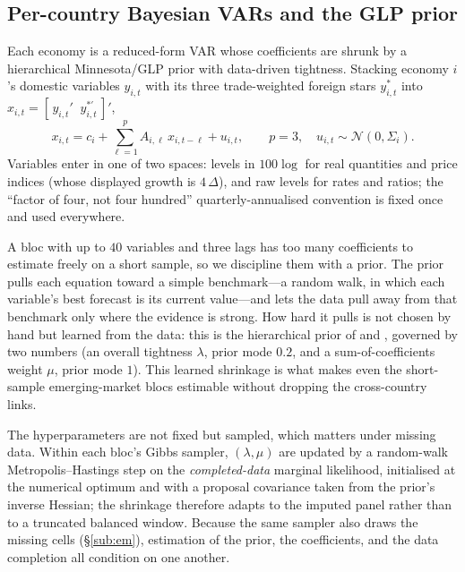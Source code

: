 \documentclass[11pt]{article}
\begin{document}
\subsection{Per-country Bayesian VARs and the GLP prior}
\label{sub:blocs}

Each economy is a reduced-form VAR whose coefficients are shrunk by a hierarchical Minnesota/GLP prior
with data-driven tightness. Stacking economy $i$'s domestic variables $y_{i,t}$ with its three
trade-weighted foreign stars $y^{*}_{i,t}$ into $x_{i,t} = [\,y_{i,t}'\;\; y^{*\prime}_{i,t}\,]'$,
\begin{equation}
  x_{i,t} = c_i + \sum_{\ell=1}^{p} A_{i,\ell}\,x_{i,t-\ell} + u_{i,t},
  \qquad p = 3,\quad u_{i,t}\sim\mathcal{N}(0,\Sigma_i).
  \label{eq:bloc}
\end{equation}
Variables enter in one of two spaces: levels in $100\log$ for real quantities and price indices (whose
displayed growth is $4\,\Delta$), and raw levels for rates and ratios; the ``factor of four, not four
hundred'' quarterly-annualised convention is fixed once and used everywhere.

A bloc with up to $40$ variables and three lags has too many coefficients to estimate freely on a short
sample, so we discipline them with a prior. The prior pulls each equation toward a simple benchmark---a
random walk, in which each variable's best forecast is its current value---and lets the data pull away
from that benchmark only where the evidence is strong. How hard it pulls is not chosen by hand but learned
from the data: this is the hierarchical prior of \citet{GiannoneLenzaPrimiceri2019} and
\citet{Giannone2015}, governed by two numbers (an overall tightness $\lambda$, prior mode $0.2$, and a
sum-of-coefficients weight $\mu$, prior mode $1$). This learned shrinkage is what makes even the
short-sample emerging-market blocs estimable without dropping the cross-country links.

The hyperparameters are not fixed but sampled, which matters under missing data. Within each bloc's
Gibbs sampler, $(\lambda,\mu)$ are updated by a random-walk Metropolis--Hastings step on the
\emph{completed-data} marginal likelihood, initialised at the numerical optimum and with a proposal
covariance taken from the prior's inverse Hessian; the shrinkage therefore adapts to the imputed panel
rather than to a truncated balanced window. Because the same sampler also draws the missing cells
(\S\ref{sub:em}), estimation of the prior, the coefficients, and the data completion all condition on one
another.
\end{document}
